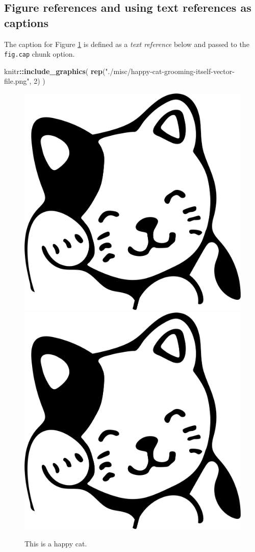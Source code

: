 \documentclass [11pt, proquest] {uwthesis}[2015/03/03]
\newenvironment{Shaded}{}{}
\newcommand{\KeywordTok}[1]{\textcolor[rgb]{0.00,0.44,0.13}{\textbf{{#1}}}}
\newcommand{\DecValTok}[1]{\textcolor[rgb]{0.25,0.63,0.44}{{#1}}}
\newcommand{\BaseNTok}[1]{\textcolor[rgb]{0.25,0.63,0.44}{{#1}}}
\newcommand{\StringTok}[1]{\textcolor[rgb]{0.25,0.44,0.63}{{#1}}}
\newcommand{\NormalTok}[1]{{#1}}
\newcommand{\OperatorTok}[1]{\textcolor[rgb]{0.00,0.44,0.13}{\textbf{{#1}}}}
\begin{document}
\subsection{Figure references and using text references as
captions}\label{figure-references-and-using-text-references-as-captions}
\begin{Shaded}
\end{Shaded}
The caption for Figure \ref{fig:happy-cat} is defined as a \emph{text
reference} below and passed to the \texttt{fig.cap} chunk option.


\begin{Shaded}
\begin{Highlighting}[]
\NormalTok{knitr}\OperatorTok{::}\KeywordTok{include_graphics}\NormalTok{(}
  \KeywordTok{rep}\NormalTok{(}\StringTok{"./misc/happy-cat-grooming-itself-vector-file.png"}\NormalTok{, }\DecValTok{2}\NormalTok{)}
\NormalTok{)}
\end{Highlighting}
\end{Shaded}
\begin{figure}
\includegraphics[width=0.3\linewidth]{./misc/happy-cat-grooming-itself-vector-file} \includegraphics[width=0.3\linewidth]{./misc/happy-cat-grooming-itself-vector-file} \caption{This is a happy cat.}\label{fig:happy-cat}
\end{figure}
\end{document}
